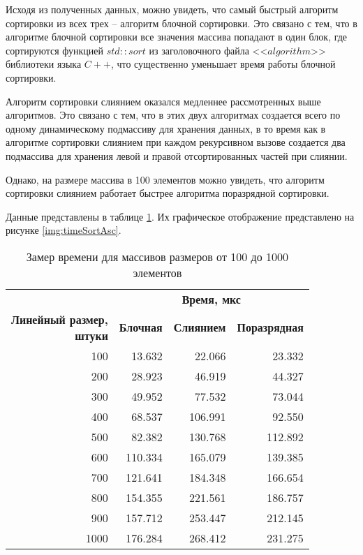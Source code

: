 Исходя из полученных данных, можно увидеть, что самый быстрый алгоритм сортировки из всех трех -- алгоритм блочной сортировки. Это связано с тем, что в алгоритме блочной сортировки все значения массива попадают в один блок, где сортируются функцией $std::sort$ из заголовочного файла <<$algorithm$>> библиотеки языка $C++$, что существенно уменьшает время работы блочной сортировки.

Алгоритм сортировки слиянием оказался медленнее рассмотренных выше алгоритмов. Это связано с тем, что в этих двух алгоритмах создается всего по одному динамическому подмассиву для хранения данных, в то время как в алгоритме сортировки слиянием при каждом рекурсивном вызове создается два подмассива для хранения левой и правой отсортированных частей при слиянии.

Однако, на размере массива в 100 элементов можно увидеть, что алгоритм сортировки слиянием работает быстрее алгоритма поразрядной сортировки.

Данные представлены в таблице \ref{tbl:timeSame}. Их графическое отображение представлено на рисунке \ref{img:timeSortAsc}.

\begin{table}[ht]
	\small
	\begin{center}
		\begin{threeparttable}
			\caption{Замер времени для массивов размеров от 100 до 1000 элементов}
			\label{tbl:timeSame}
			\begin{tabular}{|r|r|r|r|}
				\hline
				& \multicolumn{3}{c|}{\bfseries Время, мкс} \\ \cline{2-4}
				\bfseries \makecell{Линейный размер, \\ штуки} & \bfseries Блочная & \bfseries Слиянием & \bfseries Поразрядная \\ \cline{2-4}
				\hline
				100 & 13.632 & 22.066 & 23.332 \\
				\hline
				200 & 28.923 & 46.919 & 44.327 \\
				\hline
				300 & 49.952 & 77.532 & 73.044 \\
				\hline
				400 & 68.537 & 106.991 & 92.550 \\
				\hline
				500 & 82.382 & 130.768 & 112.892 \\
				\hline
				600 & 110.334 & 165.079 & 139.385 \\
				\hline
				700 & 121.641 & 184.348 & 166.654 \\
				\hline
				800 & 154.355 & 221.561 & 186.757 \\
				\hline
				900 & 157.712 & 253.447 & 212.145 \\
				\hline
				1000 & 176.284 & 268.412 & 231.275 \\
				\hline
			\end{tabular}	
		\end{threeparttable}
	\end{center}
\end{table}

